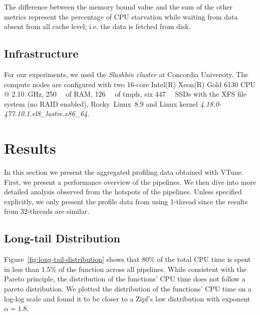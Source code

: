 \documentclass[conference]{IEEEtran}
\begin{document}
The difference between the memory bound value and the sum of the other metrics represent the percentage of CPU starvation while waiting from data absent from all cache level; i.e. the data is fetched from disk.
			
\subsection{Infrastructure}
For our experiments, we used the \textit{Slashbin cluster} at Concordia University. The compute nodes are configured with two 16-core Intel(R) Xeon(R) Gold 6130 CPU @ \SI{2.10}{\giga\hertz}, \SI{250}{\gibi\byte} of RAM, \SI{126}{\gibi\byte} of tmpfs, six \SI{447}{\gibi\byte} SSDs with the XFS file system (no RAID enabled), Rocky~Linux~8.9 and Linux kernel \textit{4.18.0-477.10.1.el8\_lustre.x86\_64}.
			
\section{Results}
In this section we present the aggregated profiling data obtained with VTune. First, we present a performance overview of the pipelines. We then dive into more detailed analysis observed from the hotspots of the pipelines. Unless specified explicitly, we only present the profile data from using 1-thread since the results from 32-threads are similar.
			
\subsection{Long-tail Distribution}
Figure~\ref{fig:long-tail-distribution} shows that 80\% of the total CPU time is spent in less than 1.5\% of the function across all pipelines. While consistent with the Pareto principle, the distribution of the functions' CPU time does not follow a pareto distribution. We plotted the distribution of the functions' CPU time on a log-log scale and found it to be closer to a Zipf's law distribution with exponent $\alpha=1.8$.
\end{document}
